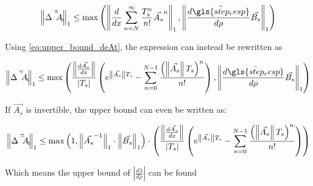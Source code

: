 \begin{equation}
 \norm{\Vec{\Delta \Tilde{A}_z}}_1 \leq \max \left(\norm{\frac{d}{dx} \sum_{n=N}^\infty \frac{T_s^n}{n!}\Vec{ A_s}^n}_1 , \norm{\frac{d \tilde{\gls{step_resp}}}{d \rho} \Vec{B_s}}_1 \right)
\end{equation}{}

Using \cref{eq:upper_bound_deAt}, the expression can instead be rewritten as





\begin{equation}
 \norm{\Vec{\Delta \Tilde{A}_z}}_1 \leq \max \left(
 \frac{\norm{\frac{d\Vec{ A_s}}{d x}}}{|T_s|} \left( e^{\norm{\Vec{A_s}} T_s} - \sum_{n=0}^{N-1} \frac{\left(\norm{\Vec{A_s}} T_s \right)^n}{n!}\right) , \norm{\frac{d \tilde{\gls{step_resp}}}{d \rho} \Vec{B_s}}_1 \right)
\end{equation}{}

If $\Vec{A_s}$ is invertible, the upper bound can even be written as: 

\begin{equation}
 \left\lVert\Vec{\Delta \Tilde{A}_z}\right\rVert_1 \leq \max \left(1, \left\lVert\Vec{A_s}^{-1}\right\rVert_1 \cdot \left\lVert\Vec{B_s}\right\rVert_1 \right) 
 \cdot \left(
 \frac{\left\lVert\frac{d\Vec{ A_s}}{d x}\right\rVert}{|T_s|} \left( e^{\left\lVert\Vec{A_s}\right\rVert T_s} - \sum_{n=0}^{N-1} \frac{\left(\left\lVert\Vec{A_s}\right\rVert T_s \right)^n}{n!}\right) \right)
\end{equation}{}

Which means the upper bound of $|\frac{d \lambda}{d \rho}|$ can be found